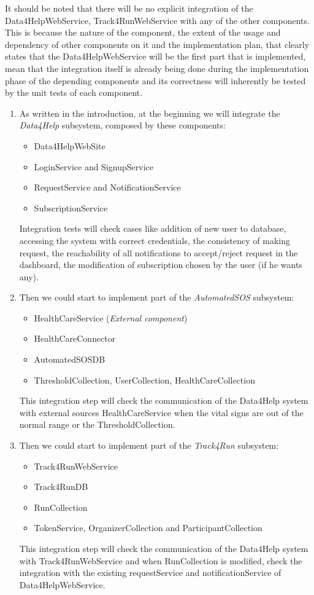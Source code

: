 \documentclass[a4paper, hidelinks, 12pt]{report}
\begin{document}
It should be noted that there will be no explicit integration of the Data4HelpWebService, Track4RunWebService with any of the other components. This is because the nature of the component, the extent of the usage and dependency of other components on it and the implementation plan, that clearly states that the Data4HelpWebService will be the first part that is implemented, mean that the integration itself is already being done during the implementation phase of the depending components and its correctness will inherently be tested by the unit tests of each component.
\begin{enumerate}
\item{} As written in the introduction, at the beginning we will integrate the \textit{Data4Help} subsystem, composed by these components:
\begin{itemize}
\item{} Data4HelpWebSite
\item{} LoginService and SignupService
\item{} RequestService and NotificationService
\item{} SubscriptionService
\end{itemize}

Integration tests will check cases like addition of new user to database, accessing the system with correct credentials, the consistency of making request, the reachability of all notifications to accept/reject request in the dashboard, the modification of subscription chosen by the user (if he wants any).

\item{} Then we could start to implement part of the \textit{AutomatedSOS} subsystem:
\begin{itemize}
\item{} HealthCareService (\textit{External component})
\item{} HealthCareConnector 
\item{} AutomatedSOSDB
\item{} ThresholdCollection, UserCollection, HealthCareCollection
\end{itemize}
This integration step will check the communication of the Data4Help system with external sources HealthCareService when the vital signs are out of the normal range or the ThresholdCollection.

\item{} Then we could start to implement part of the \textit{Track4Run} subsystem:
\begin{itemize}
\item{} Track4RunWebService
\item{} Track4RunDB 
\item{} RunCollection
\item{} TokenService, OrganizerCollection and ParticipantCollection
\end{itemize}
This integration step will check the communication of the Data4Help system with Track4RunWebService and when RunCollection is modified, check the integration with the existing requestService and notificationService of Data4HelpWebService.


\end{enumerate}
\end{document}
